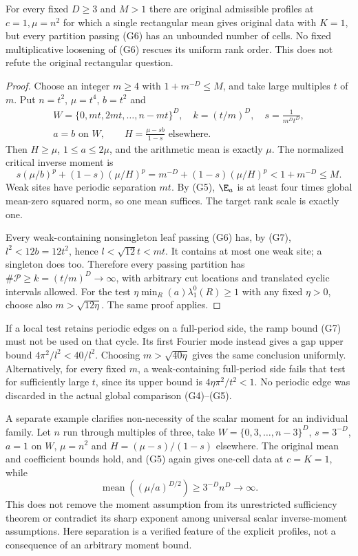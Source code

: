 \begin{proposition}\label{prop:geo-minimum}
For every fixed $D\geq3$ and $M>1$ there are original admissible profiles
at $c=1,\mu=n^2$ for which a single rectangular mean gives original data
with $K=1$, but every partition passing (G6) has an unbounded number of
cells. No fixed multiplicative loosening of (G6) rescues its uniform rank
order. This does not refute the original rectangular question.
\end{proposition}
\begin{proof}
Choose an integer $m\geq4$ with $1+m^{-D}\leq M$, and take large multiples
$t$ of $m$. Put $n=t^2$, $\mu=t^4$, $b=t^2$ and
\[
 \begin{gathered}
 W=\{0,mt,2mt,\ldots,n-mt\}^D,\quad
 k=(t/m)^D,\quad s=\frac1{m^Dt^D},\\
 a=b\text{ on }W,\qquad H=\frac{\mu-sb}{1-s}\text{ elsewhere}.
 \end{gathered}
\]
Then $H\geq\mu$, $1\leq a\leq2\mu$, and the arithmetic mean is exactly
$\mu$. The normalized critical inverse moment is
\[
 s(\mu/b)^p+(1-s)(\mu/H)^p
      =m^{-D}+(1-s)(\mu/H)^p<1+m^{-D}\leq M.
\]
Weak sites have periodic separation $mt$. By (G5), $\E_a$ is at least
four times global mean-zero squared norm, so one mean suffices. The target
rank scale is exactly one.

Every weak-containing nonsingleton leaf passing (G6) has, by (G7),
$l^2<12b=12t^2$, hence $l<\sqrt{12}t<mt$. It contains at most one weak
site; a singleton does too. Therefore every passing partition has
$\#\mathcal P\geq k=(t/m)^D\to\infty$, with arbitrary cut locations and
translated cyclic intervals allowed. For the test
$\eta\min_R(a)\lambda_1^0(R)\geq1$ with any fixed $\eta>0$, choose also
$m>\sqrt{12\eta}$. The same proof applies.
\end{proof}
If a local test retains periodic edges on a full-period side, the ramp
bound (G7) must not be used on that cycle. Its first Fourier mode instead
gives a gap upper bound $4\pi^2/l^2<40/l^2$. Choosing
$m>\sqrt{40\eta}$ gives the same conclusion uniformly. Alternatively,
for every fixed $m$, a weak-containing full-period side fails that test
for sufficiently large $t$, since its upper bound is
$4\eta\pi^2/t^2<1$. No periodic edge was discarded in the actual global
comparison (G4)--(G5).

A separate example clarifies non-necessity of the scalar moment for an
individual family. Let $n$ run through multiples of three, take
$W=\{0,3,\ldots,n-3\}^D$, $s=3^{-D}$, $a=1$ on $W$, $\mu=n^2$ and
$H=(\mu-s)/(1-s)$ elsewhere. The original mean and coefficient bounds
hold, and (G5) again gives one-cell data at $c=K=1$, while
\[
 \operatorname{mean}((\mu/a)^{D/2})\geq3^{-D}n^D\longrightarrow\infty.
\]
This does not remove the moment assumption from its unrestricted
sufficiency theorem or contradict its sharp exponent among universal
scalar inverse-moment assumptions. Here separation is a verified feature
of the explicit profiles, not a consequence of an arbitrary moment bound.

